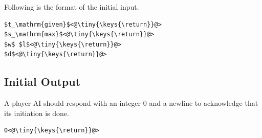 \documentclass[11pt]{article}
\begin{document}
\makeatletter
\def\lst@visiblespace{$\color{Gray}{}_{
  \mbox{\kern.06em\vrule \@height.3ex}%
  \vbox{\hrule \@width.3em}%
  \hbox{\vrule \@height.3ex}}$}
\makeatother


\noindent
Following is the format of the initial input.

\begin{lstlisting}
$t_\mathrm{given}$<@\tiny{\keys{\return}}@>
$s_\mathrm{max}$<@\tiny{\keys{\return}}@>
$w$ $l$<@\tiny{\keys{\return}}@>
$d$<@\tiny{\keys{\return}}@>
\end{lstlisting}

\subsection{Initial Output}
A player AI should respond with an integer $0$ and a newline to acknowledge that its
initiation is done.

\begin{lstlisting}
0<@\tiny{\keys{\return}}@>
\end{lstlisting}
\end{document}
